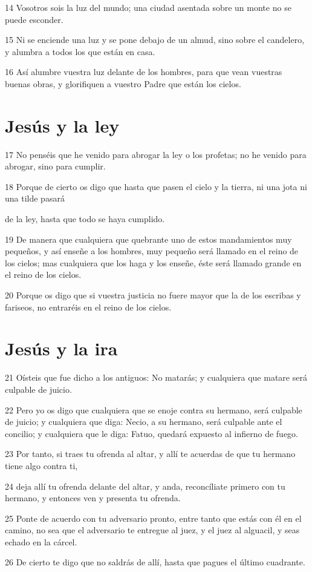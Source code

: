 \par 14 Vosotros sois la luz del mundo; una ciudad asentada sobre un monte no se puede esconder.
\par 15 Ni se enciende una luz y se pone debajo de un almud, sino sobre el candelero, y alumbra a todos los que están en casa.
\par 16 Así alumbre vuestra luz delante de los hombres, para que vean vuestras buenas obras, y glorifiquen a vuestro Padre que están los cielos.

\section*{Jesús y la ley}

\par 17 No penséis que he venido para abrogar la ley o los profetas; no he venido para abrogar, sino para cumplir.
\par 18 Porque de cierto os digo que hasta que pasen el cielo y la tierra, ni una jota ni una tilde pasará
\par de la ley, hasta que todo se haya cumplido.
\par 19 De manera que cualquiera que quebrante uno de estos mandamientos muy pequeños, y así enseñe a los hombres, muy pequeño será llamado en el reino de los cielos; mas cualquiera que los haga y los enseñe, éste será llamado grande en el reino de los cielos.
\par 20 Porque os digo que si vuestra justicia no fuere mayor que la de los escribas y fariseos, no entraréis en el reino de los cielos.

\section*{Jesús y la ira}

\par 21 Oísteis que fue dicho a los antiguos: No matarás; y cualquiera que matare será culpable de juicio.
\par 22 Pero yo os digo que cualquiera que se enoje contra su hermano, será culpable de juicio; y cualquiera que diga: Necio, a su hermano, será culpable ante el concilio; y cualquiera que le diga: Fatuo, quedará expuesto al infierno de fuego.
\par 23 Por tanto, si traes tu ofrenda al altar, y allí te acuerdas de que tu hermano tiene algo contra ti,
\par 24 deja allí tu ofrenda delante del altar, y anda, reconcíliate primero con tu hermano, y entonces ven y presenta tu ofrenda.
\par 25 Ponte de acuerdo con tu adversario pronto, entre tanto que estás con él en el camino, no sea que el adversario te entregue al juez, y el juez al alguacil, y seas echado en la cárcel.
\par 26 De cierto te digo que no saldrás de allí, hasta que pagues el último cuadrante.


